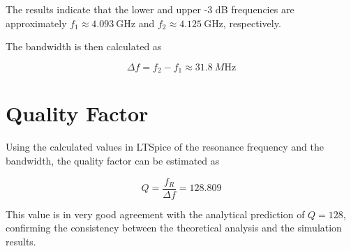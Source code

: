 The results indicate that the lower and upper -3 dB frequencies are approximately $f_1 \approx \SI{4.093}{\giga\hertz}$ and $f_2 \approx \SI{4.125}{\giga\hertz}$, respectively.

The bandwidth is then calculated as

\begin{equation}
\Delta f = f_2 - f_1 \approx 31.8 \ \si{M\hertz}
\end{equation}
\section{Quality Factor}

Using the calculated values in LTSpice of the resonance frequency and the bandwidth, the quality factor can be estimated as

\begin{equation}
Q = \frac{f_R}{\Delta f} = 128.809
\end{equation}

This value is in very good agreement with the analytical prediction of \(Q = 128\), confirming the consistency between the theoretical analysis and the simulation results.

